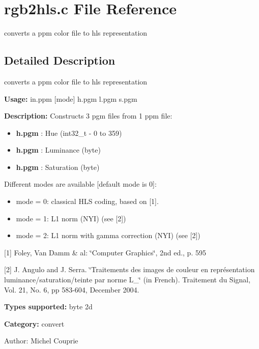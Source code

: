 \section{rgb2hls.c File Reference}
\label{rgb2hls_8c}
converts a ppm color file to hls representation 



\subsection{Detailed Description}
converts a ppm color file to hls representation 

{\bf Usage:} in.ppm [mode] h.pgm l.pgm s.pgm

{\bf Description:} Constructs 3 pgm files from 1 ppm file: \begin{itemize}
\item {\bf h.pgm} : Hue (int32\_\-t - 0 to 359) \item {\bf h.pgm} : Luminance (byte) \item {\bf h.pgm} : Saturation (byte)\end{itemize}
Different modes are available [default mode is 0]: \begin{itemize}
\item mode = 0: classical HLS coding, based on [1]. \item mode = 1: L1 norm (NYI) (see [2]) \item mode = 2: L1 norm with gamma correction (NYI) (see [2])\end{itemize}
[1] Foley, Van Damm \& al: \char`\"{}Computer Graphics\char`\"{}, 2nd ed., p. 595

[2] J. Angulo and J. Serra. \char`\"{}Traitements des images de couleur en repr\'{e}sentation luminance/saturation/teinte par norme L\_\char`\"{} (in French). Traitement du Signal, Vol. 21, No. 6, pp 583-604, December 2004.

{\bf Types supported:} byte 2d

{\bf Category:} convert

\begin{Desc}
\item[Author:]Michel Couprie \end{Desc}
